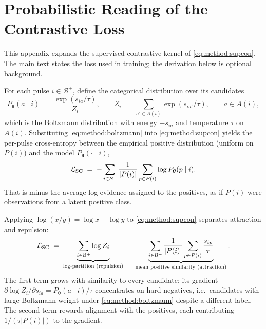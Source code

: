 \chapter{Probabilistic Reading of the Contrastive Loss}\label{app:supcon}

This appendix expands the supervised contrastive kernel of \cref{eq:method:supcon}.
The main text states the loss used in training; the derivation below is optional background.

For each pulse $i \in \mathcal{B}^{+}$, define the categorical distribution over its candidates
\begin{equation}\label{eq:method:boltzmann}
  P_{\bm{\theta}}(a \mid i) \;=\; \frac{\exp(s_{ia}/\tau)}{Z_i},
  \qquad
  Z_i \;=\; \sum_{a' \in A(i)} \exp(s_{ia'}/\tau),
  \qquad a \in A(i),
\end{equation}
which is the Boltzmann distribution with energy $-s_{ia}$ and temperature $\tau$ on $A(i)$.
Substituting \cref{eq:method:boltzmann} into \cref{eq:method:supcon} yields the per-pulse cross-entropy between the empirical positive distribution (uniform on $P(i)$) and the model $P_{\bm{\theta}}(\cdot \mid i)$,
\begin{equation}\label{eq:method:supcon_logp}
  \mathcal{L}_{\mathrm{SC}}
  \;=\;
  -\sum_{i \in \mathcal{B}^{+}} \frac{1}{\lvert P(i)\rvert}
  \sum_{p \in P(i)} \log P_{\bm{\theta}}(p \mid i).
\end{equation}
That is minus the average log-evidence assigned to the positives, as if $P(i)$ were observations from a latent positive class.

Applying $\log(x/y) = \log x - \log y$ to \cref{eq:method:supcon} separates attraction and repulsion:
\begin{equation}\label{eq:method:supcon_split}
  \mathcal{L}_{\mathrm{SC}}
  \;=\;
  \underbrace{\sum_{i \in \mathcal{B}^{+}} \log Z_i}_{\text{log-partition (repulsion)}}
  \;-\;
  \underbrace{\sum_{i \in \mathcal{B}^{+}} \frac{1}{\lvert P(i)\rvert} \sum_{p \in P(i)} \frac{s_{ip}}{\tau}}_{\text{mean positive similarity (attraction)}}.
\end{equation}
The first term grows with similarity to every candidate; its gradient $\partial \log Z_i / \partial s_{ia} = P_{\bm{\theta}}(a\mid i)/\tau$ concentrates on hard negatives, i.e.\ candidates with large Boltzmann weight under \cref{eq:method:boltzmann} despite a different label.
The second term rewards alignment with the positives, each contributing $1/(\tau\lvert P(i)\rvert)$ to the gradient.

